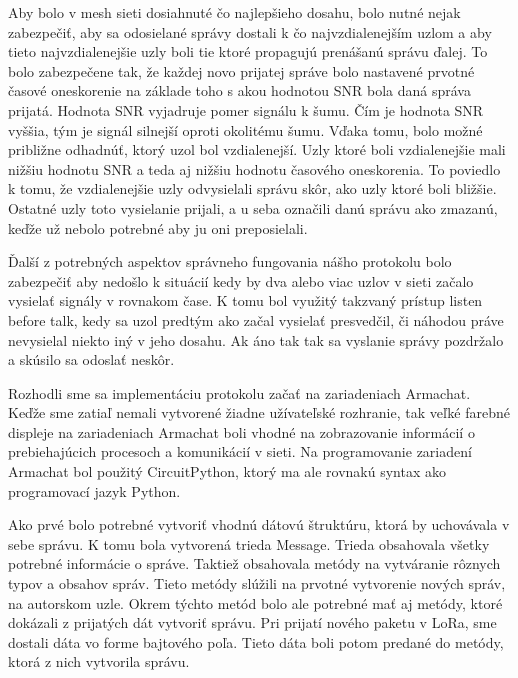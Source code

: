 \documentclass[slovak,master]{diploma}
\begin{document}
Aby bolo v mesh sieti dosiahnuté čo najlepšieho dosahu, bolo nutné nejak zabezpečiť, aby sa odosielané správy dostali k čo najvzdialenejším uzlom a aby tieto 
najvzdialenejšie uzly boli tie ktoré propagujú prenášanú správu ďalej. To bolo zabezpečene tak, že každej novo prijatej správe bolo nastavené prvotné časové oneskorenie na základe 
toho s akou hodnotou SNR bola daná správa prijatá. Hodnota SNR vyjadruje pomer signálu k šumu. Čím je hodnota SNR vyššia, tým je signál silnejší oproti okolitému šumu.
Vďaka tomu, bolo možné približne odhadnúť, ktorý uzol bol vzdialenejší. Uzly ktoré boli vzdialenejšie mali nižšiu hodnotu SNR a teda aj nižšiu hodnotu časového oneskorenia.
To poviedlo k tomu, že vzdialenejšie uzly odvysielali správu skôr, ako uzly ktoré boli bližšie. Ostatné uzly toto vysielanie prijali, a u seba označili danú správu ako zmazanú, 
keďže už nebolo potrebné aby ju oni preposielali.

Ďalší z potrebných aspektov správneho fungovania nášho protokolu bolo zabezpečiť aby nedošlo k situácií kedy by dva alebo viac uzlov v sieti začalo vysielať signály v rovnakom čase.
K tomu bol využitý takzvaný prístup listen before talk, kedy sa uzol predtým ako začal vysielať presvedčil, či náhodou práve nevysielal niekto iný v jeho dosahu. Ak áno tak tak sa vyslanie správy pozdržalo 
a skúsilo sa odoslať neskôr.

Rozhodli sme sa implementáciu protokolu začať na zariadeniach Armachat. Keďže sme zatiaľ nemali vytvorené žiadne užívateľské rozhranie, tak veľké farebné displeje na zariadeniach Armachat 
boli vhodné na zobrazovanie informácií o prebiehajúcich procesoch a komunikácií v sieti. Na programovanie zariadení Armachat bol použitý CircuitPython, ktorý ma ale rovnakú syntax ako 
programovací jazyk Python.

Ako prvé bolo potrebné vytvoriť vhodnú dátovú štruktúru, ktorá by uchovávala v sebe správu. K tomu bola vytvorená trieda Message. Trieda obsahovala všetky potrebné informácie o správe. 
Taktiež obsahovala metódy na vytváranie rôznych typov a obsahov správ. Tieto metódy slúžili na prvotné vytvorenie nových správ, na autorskom uzle. Okrem týchto metód bolo 
ale potrebné mať aj metódy, ktoré dokázali z prijatých dát vytvoriť správu. Pri prijatí nového paketu v LoRa, sme dostali dáta vo forme bajtového poľa. Tieto dáta boli potom predané 
do metódy, ktorá z nich vytvorila správu.
\end{document}
